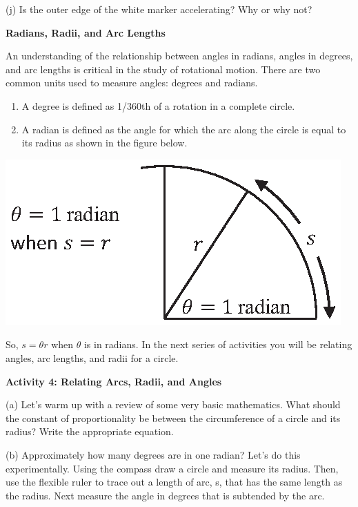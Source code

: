 (j) Is the outer edge of the white marker accelerating? Why or why not?
\vspace{20mm}

\textbf{Radians, Radii, and Arc Lengths} 

An understanding of the relationship between angles in radians, angles in degrees, and arc lengths is critical in the study of rotational motion. There are two
common units used to measure angles: degrees and radians.

\begin{enumerate}
\item A degree is defined as 1/360th of a rotation in a complete circle.
\item A radian is defined as the angle for which the arc along the circle is equal to its radius as shown in the figure below.
\end{enumerate}
\vspace{0.3cm}
{\par\centering \includegraphics{rotation/one_radian.eps} \par}
\vspace{0.3cm}

So, \(s = \theta r \) when \( \theta \) is in radians. \hfill \break
In the next series of activities you will be relating angles, arc lengths, and
radii for a circle.


\textbf{Activity 4: Relating Arcs, Radii, and Angles} 

(a) Let's warm up with a review of some very basic mathematics. What should
the constant of proportionality be between the circumference of a circle and
its radius? Write the appropriate equation.
\answerspace{10mm}

(b) Approximately how many degrees are in one radian? Let's do this experimentally.
Using the compass draw a circle and measure its radius. Then, use the flexible
ruler to trace out a length of arc, s, that has the same length as the radius.
Next measure the angle in degrees that is subtended by the arc.
\answerspace{40mm}

